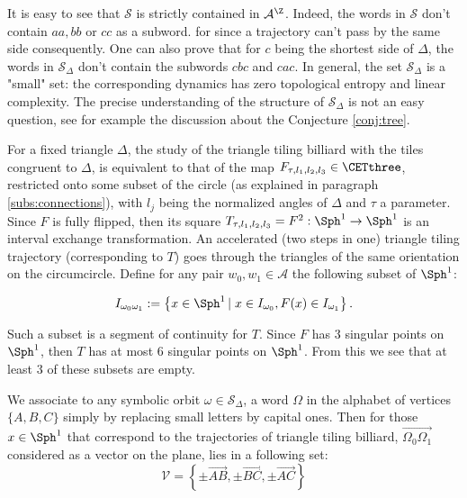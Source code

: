 \documentclass[12pt]{article}
\theoremstyle{definition}
\begin{document}
It is easy to see that $\mathcal{S}$ is strictly contained in $\mathcal{A}^{\Z}$. Indeed, the words in $\mathcal{S}$ don't contain $aa, bb$ or $cc$ as a subword.  for since a trajectory can't pass by the same side consequently. One can also prove that for $c$ being the shortest side of $\Delta$, the words in $\mathcal{S}_{\Delta}$ don't contain the subwords $cbc$ and $cac$. In general, the set $\mathcal{S}_{\Delta}$ is a "small" set: the corresponding dynamics has zero topological entropy and linear complexity. The precise understanding of the structure of $\mathcal{S}_{\Delta}$ is not an easy question, see for example the discussion about the Conjecture \ref{conj:tree}. 

\smallskip

For a fixed triangle $\Delta$, the study of the triangle tiling billiard with the tiles congruent to $\Delta$, is equivalent to that of the map $F_{\tau, l_1, l_2, l_3} \in \CETthree$, restricted onto some subset of the circle (as explained in paragraph \ref{subs:connections}), with $l_j$ being the normalized angles of $\Delta$ and $\tau$ a parameter. Since $F$ is fully flipped, then its square $T_{\tau, l_1, l_2, l_3}=F^2: \Sph^1 \rightarrow \Sph^1$ is an interval exchange transformation. An accelerated (two steps in one) triangle tiling trajectory (corresponding to $T$) goes through the triangles of the same orientation on the circumcircle. Define  for any pair $ w_0, w_1 \in \mathcal{A}$ the following subset of $\Sph^1$:

\begin{equation}\label{eq:sets_symbolic}
I_{\omega_0 \omega_1}:=\left\{
x \in \Sph^1 \left| \right. x \in I_{\omega_0}, F(x) \in I_{\omega_1} 
\right\}.
\end{equation}

Such a subset is a segment of continuity for $T$. Since $F$ has $3$ singular points on $ \Sph^1 $, then $T$ has at most $6$ singular points on $ \Sph^1 $. From this we see that at least $3$ of these subsets are empty. 

We associate to any symbolic orbit $\omega \in \mathcal{S}_{\Delta}$, a word $\Omega$ in the alphabet of vertices $\{A,B,C\}$ simply by replacing small letters by capital ones. Then for those $x \in \Sph^1 $ that correspond to the trajectories of triangle tiling billiard, $\overrightarrow{\Omega_0 \Omega_1}$ considered as a vector on the plane, lies in a following set: 
\begin{equation}\label{eq:possible directions}
\mathcal{V}=\left\{
\pm \overrightarrow{AB}, \pm \overrightarrow{BC}, \pm \overrightarrow{AC}
\right\}
\end{equation}
\end{document}
